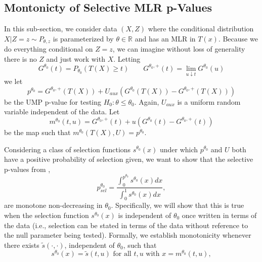 \documentclass{article}
\newcommand{\R}{\mathbb{R}}
\begin{document}
\begin{appendix}
\subsection{Montonicty of Selective MLR p-Values}
\label{sec:one_sided_monotone_appdx}

In this sub-section, we consider data $(X, Z)$ where the conditional distribution $X | Z= z \sim P_{\theta, z}$ is parameterized by $\theta \in \R$ and has an MLR in $T(x)$. Because we do everything conditional on $Z=z$, we can imagine without loss of generality there is no $Z$ and just work with $X$. Letting
\begin{equation*}
    G^{\theta_0}(t) = P_{\theta_0}(T(X) \geq t) \qquad G^{\theta_0, +}(t) = \lim_{u \downarrow t} G^{\theta_0}(u)
\end{equation*}
we let 
\begin{equation*}
    p^{\theta_0} = G^{\theta_0, +}(T(X)) + U_{aux}(G^{\theta_0}(T(X)) - G^{\theta_0, +}(T(X)))
\end{equation*}
be the UMP p-value for testing $H_{0}: \theta \leq \theta_0$. Again, $U_{aux}$ is a uniform random variable independent of the data. Let 
\begin{equation*}
    m^{\theta_0}(t, u) = G^{\theta_0, +}(t) + u(G^{\theta_0}(t) - G^{\theta_0, +}(t))
\end{equation*}
be the map such that $m^{\theta_0}(T(X), U) = p^{\theta_0}$. 

Considering a class of selection functions $s^{\theta_0}(x)$ under which $p^{\theta_0}$ and $U$ both have a positive probability of selection given, we want to show that the selective p-values from , 
\begin{equation*}
    p^{\theta_0}_{sel} = \frac{\int_{0}^{p^{\theta_0}} s^{\theta_0}(x) dx}{\int_{0}^{1} s^{\theta_0}(x) dx},
\end{equation*}
are monotone non-decreasing in $\theta_0$. Specifically, we will show that this is true when the selection function $s^{\theta_0}(x)$ is independent of $\theta_0$ once written in terms of the data (i.e., selection can be stated in terms of the data without reference to the null parameter being tested). Formally, we establish monotonicity whenever there exists $\tilde{s}(\cdot, \cdot)$, independent of $\theta_0$, such that 
\begin{equation*}
    s^{\theta_0}(x) = \tilde{s}(t, u) \text{ for all } t, u \text{ with } x = m^{\theta_0}(t, u), 
\end{equation*}


\end{appendix}
\end{document}
